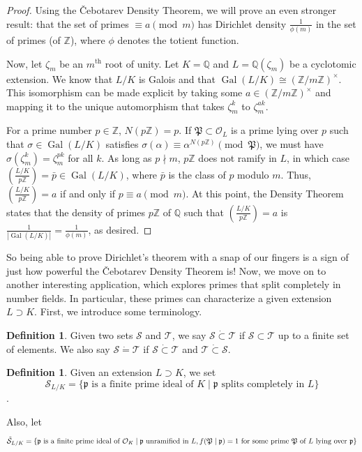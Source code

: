 \documentclass{article}
\DeclareMathOperator{\Gal}{Gal}
\newcommand{\QQ}{\mathbb{Q}}
\newcommand{\ZZ}{\mathbb{Z}}
\theoremstyle{plain}
\theoremstyle{definition}
\newtheorem{defn}[thm]{Definition}
\theoremstyle{remark}
\numberwithin{equation}{section}
\numberwithin{thm}{section}
\begin{document}
\begin{proof}
Using the Čebotarev Density Theorem, we will prove an even stronger result: that the set of primes $\equiv a \pmod{m}$ has Dirichlet density $\frac{1}{\phi(m)}$ in the set of primes (of $\ZZ$), where $\phi$ denotes the totient function.

Now, let $\zeta_{m}$ be an $m^{\text{th}}$ root of unity. Let $K = \QQ$ and $L = \QQ(\zeta_{m})$ be a cyclotomic extension. We know that $L/K$ is Galois and that $\Gal(L/K) \cong (\ZZ/m\ZZ)^{\times}$. This isomorphism can be made explicit by taking some $a \in (\ZZ/m\ZZ)^{\times}$ and mapping it to the unique automorphism that takes $\zeta_{m}^{k}$ to $\zeta_{m}^{ak}$. 

For a prime number $p \in \ZZ$, $N(p\ZZ) = p$. If $\mathfrak{P} \subset \mathcal{O}_L$ is a prime lying over $p$ such that $\sigma \in \Gal(L/K)$ satisfies $\sigma(\alpha) \equiv \alpha^{N(p\ZZ)} \pmod{\mathfrak{P}}$, we must have $\sigma(\zeta_{m}^{k}) = \zeta_{m}^{pk}$ for all $k$. As long as $p \nmid m$, $p\ZZ$ does not ramify in $L$, in which case $\left(\frac{L/K}{p\ZZ}\right) = \bar{p} \in \Gal(L/K)$, where $\bar{p}$ is the class of $p$ modulo $m$. Thus, $\left(\frac{L/K}{p\ZZ}\right) = a$ if and only if $p \equiv a \pmod{m}$. At this point, the Density Theorem states that the density of primes $p\ZZ$ of $\QQ$ such that $\left(\frac{L/K}{p\ZZ}\right) = a$ is $\frac{1}{|\Gal(L/K)|} = \frac{1}{\phi(m)}$, as desired. 
\end{proof}

So being able to prove Dirichlet's theorem with a snap of our fingers is a sign of just how powerful the Čebotarev Density Theorem is! Now, we move on to another interesting application, which explores primes that split completely in number fields. In particular, these primes can characterize a given extension $L \supset K$. First, we introduce some terminology.

\begin{defn}
Given two sets $\mathcal{S}$ and $\mathcal{T}$, we say $\mathcal{S} \dot{\subset} \mathcal{T}$ if $\mathcal{S} \subset \mathcal{T}$ up to a finite set of elements. We also say $\mathcal{S} \dot{=} \mathcal{T}$ if $\mathcal{S} \dot{\subset} \mathcal{T}$ and $\mathcal{T} \dot{\subset} \mathcal{S}$. 
\end{defn}

\begin{defn}
Given an extension $L \supset K$, we set $$\mathcal{S}_{L/K} = \{\mathfrak{p} \text{ is a finite prime ideal of } K \mid \mathfrak{p} \text{ splits completely in } L\}$$.  

Also, let $$\Tilde{\mathcal{S}}_{L/K} = \{\mathfrak{p} \text{ is a finite prime ideal of } \mathcal{O}_K \mid \mathfrak{p} \text{ unramified in } L, f(\mathfrak{P} \mid \mathfrak{p}) = 1 \text{ for some prime } \mathfrak{P} \text{ of } L \text{ lying over } \mathfrak{p}\}$$
\end{defn}
\end{document}
